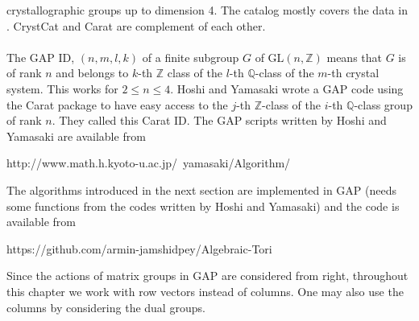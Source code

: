 \documentclass{article}
\theoremstyle{plain}
\theoremstyle{definition}
\newcommand{\Z}{\ensuremath{\mathbb{Z}}}
\newcommand{\Q}{\ensuremath{\mathbb{Q}}}
\begin{document}
crystallographic groups up to dimension 4. The catalog mostly covers the data in 
\cite{Crystallography}. CrystCat and Carat are complement of each other. \\
\\
The GAP ID, $(n,m,l,k)$ of a finite subgroup $G$ of $\mathrm{GL}(n,\Z)$ means that 
$G$ is of rank $n$ and belongs to $k$-th $\Z$ class of the $l$-th $\Q$-class of the 
$m$-th crystal system. This works for $2\leq n \leq 4$. Hoshi and Yamasaki wrote 
a GAP code using the Carat package to have easy access to the $j$-th $\Z$-class 
of the $i$-th $\Q$-class group of rank $n$. They called this Carat ID. The GAP 
scripts written by Hoshi and Yamasaki are available from
\begin{center}
http://www.math.h.kyoto-u.ac.jp/~yamasaki/Algorithm/
\end{center}
The algorithms introduced in the next section are implemented in GAP (needs some 
functions from the codes written by Hoshi and Yamasaki) and the code is available from
\begin{center}
https://github.com/armin-jamshidpey/Algebraic-Tori
\end{center}
Since the actions of matrix groups in GAP are considered from right, throughout 
this chapter we work with row vectors instead of columns. One may also use the 
columns by considering the dual groups.
\end{document}
